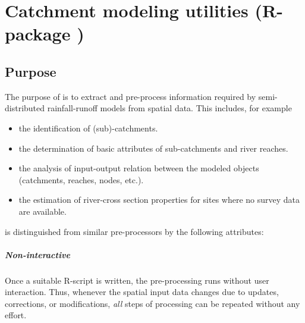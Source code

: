 
\chapter{Catchment modeling utilities (R-package )} \label{chap:topocatch}
\renewcommand{\tabdir}{chapters/topocatch/tab}
\renewcommand{\figdir}{chapters/topocatch/fig}

\section{Purpose} \label{sec:topocatch:purpose}

The purpose of  \citep{topocatch} is to extract and pre-process information required by semi-distributed rainfall-runoff models from spatial data. This includes, for example
\begin{itemize}
  \item the identification of (sub)-catchments.
  \item the determination of basic attributes of sub-catchments and river reaches.
  \item the analysis of input-output relation between the modeled objects (catchments, reaches, nodes, etc.).
  \item the estimation of river-cross section properties for sites where no survey data are available.
\end{itemize}

 is distinguished from similar pre-processors by the following attributes:

\paragraph{Non-interactive} Once a suitable R-script is written, the pre-processing runs without user interaction. Thus, whenever the spatial input data changes due to updates, corrections, or modifications, \emph{all} steps of processing can be repeated without any effort.

